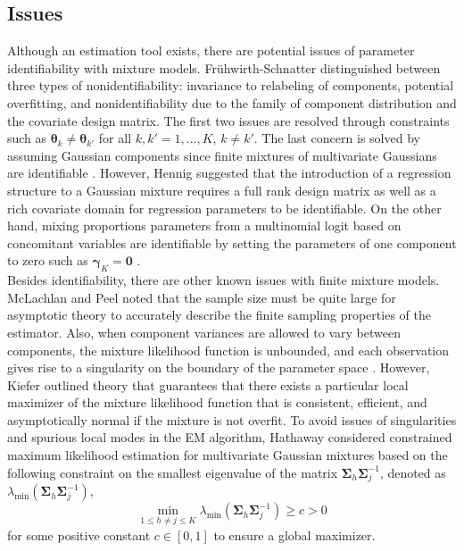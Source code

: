 \documentclass[10pt]{article}
\newcommand{\bs}[0]{\boldsymbol}
\begin{document}
\subsection{Issues}
Although an estimation tool exists, there are potential issues of parameter identifiability with mixture models. Fr{\"u}hwirth-Schnatter \cite{fruhwirth2006} distinguished between three types of nonidentifiability: invariance to  relabeling of components, potential overfitting, and nonidentifiability due to the family of component distribution and the covariate design matrix. The first two issues are resolved through constraints such as $\bs\theta_{k}\not=\bs\theta_{k'}$ for all $k,k'=1,...,K$, $k\not=k'$. The last concern is solved by assuming Gaussian components since finite mixtures of multivariate Gaussians are identifiable \cite{teicher1963,yakowitz1968}. However, Hennig \cite{hennig2000} suggested that the introduction of a regression structure to a Gaussian mixture requires a full rank design matrix as well as a rich covariate domain for regression parameters to be identifiable. On the other hand, mixing proportions parameters from a multinomial logit based on concomitant variables are identifiable by setting the parameters of one component to zero such as $\bs\gamma_{K}=\bs0$ \cite{jiang1999}.\\

Besides identifiability, there are other known issues with finite mixture models. McLachlan and Peel \cite{mclachlan2000} noted that the sample size must be quite large for asymptotic theory to accurately describe the finite sampling properties of the estimator. Also, when component variances are allowed to vary between components, the mixture likelihood function is unbounded, and each observation gives rise to a singularity on the boundary of the parameter space \cite{day1969,kiefer1956}. However, Kiefer \cite{kiefer1978} outlined theory that guarantees that there exists a particular local maximizer of the mixture likelihood function that is consistent, efficient, and asymptotically normal if the mixture is not overfit. To avoid issues of singularities and spurious local modes in the EM algorithm, Hathaway \cite{hathaway1985} considered constrained maximum likelihood estimation for multivariate Gaussian mixtures based on the following constraint on the smallest eigenvalue of the matrix $\bs\Sigma_{h}\bs\Sigma_{j}^{-1}$, denoted as $\lambda_{\text{min}}(\bs\Sigma_{h}\bs\Sigma_{j}^{-1})$,
$$\min_{1\leq h\not=j\leq K}\lambda_{\text{min}}(\bs\Sigma_{h}\bs\Sigma_{j}^{-1})\geq c > 0$$ for some positive constant $c\in[0,1]$ to ensure a global maximizer. 
\end{document}
